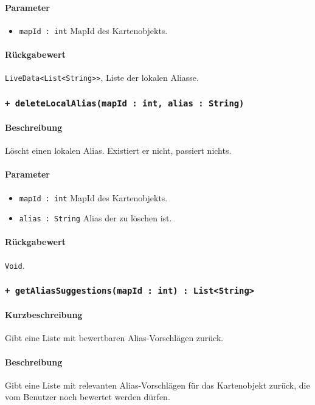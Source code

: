 \paragraph*{Parameter}
\begin{itemize}
    \item \texttt{mapId : int} MapId des Kartenobjekts.
\end{itemize}
\paragraph*{Rückgabewert}
\texttt{LiveData<List<String>>}, Liste der lokalen Aliasse.

\subsubsection*{\texttt{+ deleteLocalAlias(mapId : int, alias : String)}}%
\paragraph*{Beschreibung}
Löscht einen lokalen Alias. Existiert er nicht, passiert nichts.
\paragraph*{Parameter}
\begin{itemize}
    \item \texttt{mapId : int} MapId des Kartenobjekts.
    \item \texttt{alias : String} Alias der zu löschen ist.
\end{itemize}
\paragraph*{Rückgabewert}
\texttt{Void}.

\subsubsection*{\texttt{+ getAliasSuggestions(mapId : int) : List<String>}}%
\paragraph*{Kurzbeschreibung}
Gibt eine Liste mit bewertbaren Alias-Vorschlägen zurück.
\paragraph*{Beschreibung}
Gibt eine Liste mit relevanten Alias-Vorschlägen für das Kartenobjekt zurück, 
die vom Benutzer noch bewertet werden dürfen.
